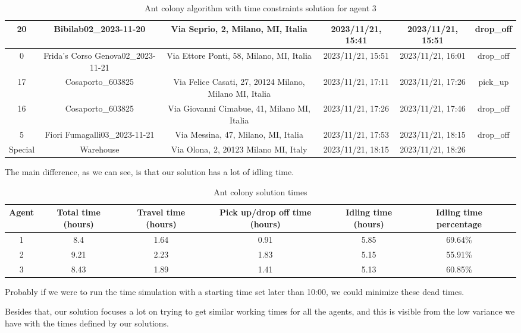 \documentclass[titlepage]{article}
\begin{document}
\begin{table}[H]
\begin{adjustbox}{max width=\textwidth}
\begin{tabular}{|c|c|c|c|c|c|}
\hline
20 & Bibilab02\_2023-11-20 & Via Seprio, 2, Milano, MI, Italia & 2023/11/21, 15:41 & 2023/11/21, 15:51 & drop\_off \\
\hline
0 & Frida's Corso Genova02\_2023-11-21 & Via Ettore Ponti, 58, Milano, MI, Italia & 2023/11/21, 15:51 & 2023/11/21, 16:01 & drop\_off \\
\hline
17 & Cosaporto\_603825 & Via Felice Casati, 27, 20124 Milano, Milano MI, Italia & 2023/11/21, 17:11 & 2023/11/21, 17:26 & pick\_up \\
\hline
16 & Cosaporto\_603825 & Via Giovanni Cimabue, 41, Milano MI, Italia & 2023/11/21, 17:26 & 2023/11/21, 17:46 & drop\_off \\
\hline
5 & Fiori Fumagalli03\_2023-11-21 & Via Messina, 47, Milano, MI, Italia & 2023/11/21, 17:53 & 2023/11/21, 18:15 & drop\_off \\
\hline
Special & Warehouse & Via Olona, 2, 20123 Milano MI, Italy & 2023/11/21, 18:15 & 2023/11/21, 18:26 & \\
\hline
\end{tabular}
\end{adjustbox}
\caption{Ant colony algorithm with time constraints solution for agent 3}
\label{tab:mysolution3}
\end{table}

The main difference, as we can see, is that our solution has a lot of idling time.

\begin{table}[H]
\centering
\begin{adjustbox}{max width=\textwidth}
\begin{tabular}{|c|c|c|c|c|c|c|}
\hline
Agent & Total time (hours) & Travel time (hours) & Pick up/drop off time (hours) & Idling time (hours) & Idling time percentage\\
\hline
\hline
1 & 8.4 & 1.64 & 0.91 & 5.85 & 69.64\%\\
\hline
2 & 9.21 & 2.23 & 1.83 & 5.15 & 55.91\%\\
\hline
3 & 8.43 & 1.89 & 1.41 & 5.13 & 60.85\%\\
\hline
\end{tabular}
\end{adjustbox}
\caption{Ant colony solution times}
\label{tab:ant_solution_times}
\end{table}

Probably if we were to run the time simulation with a starting time set later than 10:00, we could minimize these dead times.

Besides that, our solution focuses a lot on trying to get similar working times for all the agents, and this is visible from the low variance we have with the times defined by our solutions.
\end{document}
